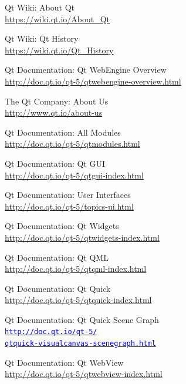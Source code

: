 \documentclass[12pt]{report}
\let\orighref\href
\renewcommand{\href}[2]{%
    \orighref{#1}{\textcolor{blue}{\texttt{#2}}}
}
\let\origurl\url
\renewcommand{\url}[1]{%
    \textcolor{blue}{\origurl{#1}}
}
\begin{document}
\begin{thebibliography}{9}
        Qt Wiki: About Qt \\
        \url{https://wiki.qt.io/About_Qt}

        Qt Wiki: Qt History \\
        \url{https://wiki.qt.io/Qt_History}

        Qt Documentation: Qt WebEngine Overview \\
        \url{http://doc.qt.io/qt-5/qtwebengine-overview.html}

        The Qt Company: About Us \\
        \url{http://www.qt.io/about-us}

        Qt Documentation: All Modules \\
        \url{http://doc.qt.io/qt-5/qtmodules.html}

        Qt Documentation: Qt GUI \\
        \url{http://doc.qt.io/qt-5/qtgui-index.html}

        Qt Documentation: User Interfaces \\
        \url{http://doc.qt.io/qt-5/topics-ui.html}

        Qt Documentation: Qt Widgets \\
        \url{http://doc.qt.io/qt-5/qtwidgets-index.html}

        Qt Documentation: Qt QML \\
        \url{http://doc.qt.io/qt-5/qtqml-index.html}

        Qt Documentation: Qt Quick \\
        \url{http://doc.qt.io/qt-5/qtquick-index.html}

        Qt Documentation: Qt Quick Scene Graph \\
        \href{http://doc.qt.io/qt-5/qtquick-visualcanvas-scenegraph.html}
        {http://doc.qt.io/qt-5/\\
        qtquick-visualcanvas-scenegraph.html}

        Qt Documentation: Qt WebView \\
        \url{http://doc.qt.io/qt-5/qtwebview-index.html}


\end{thebibliography}
\end{document}

